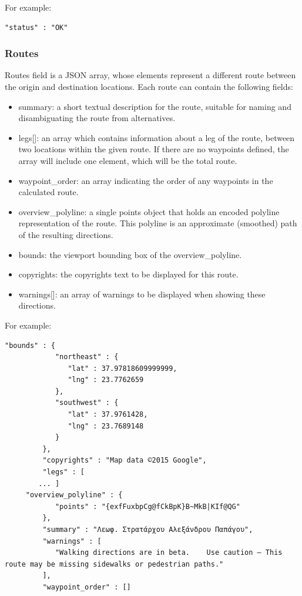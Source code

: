 For example:

\begin{lstlisting}[basicstyle=\footnotesize\ttfamily, breaklines=true]
 "status" : "OK"
\end{lstlisting}

\subsubsection{Routes}

Routes field is a JSON array, whose elements represent a different route between the origin and destination locations. Each route can contain the following 
fields:

\begin{itemize}
 \item summary: a short textual description for the route, suitable for naming and disambiguating the route from alternatives.
 \item legs[]: an array which contains information about a leg of the route, between two locations within the given route. If there are no 
 waypoints defined, the array will include one element, which will be the total route. 
 \item waypoint\_order: an array indicating the order of any waypoints in the calculated route. 
 \item overview\_polyline: a single points object that holds an encoded polyline representation of the route. This polyline is an approximate 
 (smoothed) path of the resulting directions.
 \item bounds: the viewport bounding box of the overview\_polyline.
 \item copyrights: the copyrights text to be displayed for this route. 
 \item warnings[]: an array of warnings to be displayed when showing these directions.
\end{itemize}

For example:

\begin{lstlisting}[basicstyle=\footnotesize\ttfamily, breaklines=true]
	"bounds" : {
            "northeast" : {
               "lat" : 37.97818609999999,
               "lng" : 23.7762659
            },
            "southwest" : {
               "lat" : 37.9761428,
               "lng" : 23.7689148
            }
         },
         "copyrights" : "Map data ©2015 Google",
         "legs" : [
	    ... ]
	 "overview_polyline" : {
            "points" : "{exfFuxbpCg@fCkBpK}B~MkB|KIf@QG"
         },
         "summary" : "Λεωφ. Στρατάρχου Αλεξάνδρου Παπάγου",
         "warnings" : [
            "Walking directions are in beta.    Use caution – This route may be missing sidewalks or pedestrian paths."
         ],
         "waypoint_order" : []   
\end{lstlisting}

